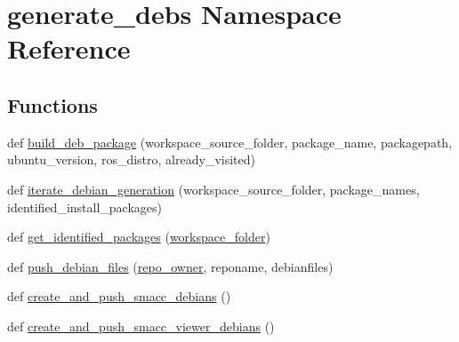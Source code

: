 \hypertarget{namespacegenerate__debs}{}\section{generate\+\_\+debs Namespace Reference}
\label{namespacegenerate__debs}
\subsection*{Functions}
\begin{DoxyCompactItemize}
\item 
def \hyperlink{namespacegenerate__debs_aa70c3f4917ddc57b13eaed8501f571a8}{build\+\_\+deb\+\_\+package} (workspace\+\_\+source\+\_\+folder, package\+\_\+name, packagepath, ubuntu\+\_\+version, ros\+\_\+distro, already\+\_\+visited)
\item 
def \hyperlink{namespacegenerate__debs_ae054e8989bfe5e5f05d5f9b8d9686c66}{iterate\+\_\+debian\+\_\+generation} (workspace\+\_\+source\+\_\+folder, package\+\_\+names, identified\+\_\+install\+\_\+packages)
\item 
def \hyperlink{namespacegenerate__debs_aa91b87c6d9c3ed04015845cc9298431a}{get\+\_\+identified\+\_\+packages} (\hyperlink{namespacegenerate__debs_acb69863b90257249a30e43ebacfb8bd8}{workspace\+\_\+folder})
\item 
def \hyperlink{namespacegenerate__debs_aac577281b086e6d24e7eb86ce2302398}{push\+\_\+debian\+\_\+files} (\hyperlink{namespacegenerate__debs_adec04970ffa308e6dec7d8e42f63fc55}{repo\+\_\+owner}, reponame, debianfiles)
\item 
def \hyperlink{namespacegenerate__debs_a053a5a43cb6a7445e7217c9c48adf235}{create\+\_\+and\+\_\+push\+\_\+smacc\+\_\+debians} ()
\item 
def \hyperlink{namespacegenerate__debs_aafc2a6104895b90262c89b31ae1cd156}{create\+\_\+and\+\_\+push\+\_\+smacc\+\_\+viewer\+\_\+debians} ()
\end{DoxyCompactItemize}
